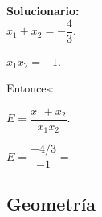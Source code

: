 \begin{enumerate}
	\vspace{2mm}
	\textbf{Solucionario:}\\
	
	
	$x_1+x_2=-\dfrac{4}{3}$.
	
	$x_1x_2=-1$.
	
	Entonces:
	
	$E=\dfrac{x_1+x_2}{x_1x_2}$.
	
	$E=\dfrac{-4/3}{-1}=$
	
	\vspace{6mm}
\end{enumerate}

\subsection*{Geometría}

